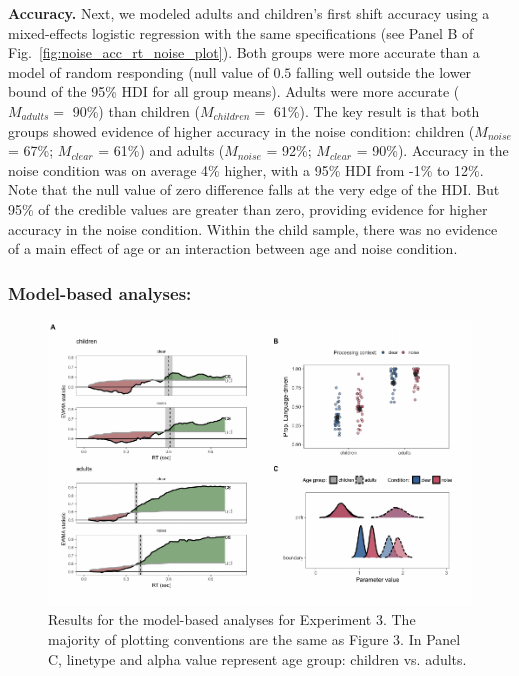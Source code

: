 \documentclass[english,floatsintext,man]{apa6}
\theoremstyle{definition}
\theoremstyle{definition}
\theoremstyle{definition}
\theoremstyle{remark}
\begin{document}
\textbf{Accuracy.} Next, we modeled adults and children's first shift
accuracy using a mixed-effects logistic regression with the same
specifications (see Panel B of Fig.~\ref{fig:noise_acc_rt_noise_plot}).
Both groups were more accurate than a model of random responding (null
value of \(0.5\) falling well outside the lower bound of the 95\% HDI
for all group means). Adults were more accurate (\(M_{adults} =\) 90\%)
than children (\(M_{children} =\) 61\%). The key result is that both
groups showed evidence of higher accuracy in the noise condition:
children (\(M_{noise}\) = 67\%; \(M_{clear}\) = 61\%) and adults
(\(M_{noise}\) = 92\%; \(M_{clear}\) = 90\%). Accuracy in the noise
condition was on average 4\% higher, with a 95\% HDI from -1\% to 12\%.
Note that the null value of zero difference falls at the very edge of
the HDI. But 95\% of the credible values are greater than zero,
providing evidence for higher accuracy in the noise condition. Within
the child sample, there was no evidence of a main effect of age or an
interaction between age and noise condition.

\hypertarget{model-based-analyses-2}{%
\subsubsection{Model-based analyses:}\label{model-based-analyses-2}}

\begin{figure}[tb]

{\centering \includegraphics[width=0.9\linewidth]{figs/noise-model-plots-1} 

}

\caption{Results for the model-based analyses for Experiment 3. The majority of plotting conventions are the same as Figure 3. In Panel C, linetype and alpha value represent age group: children vs. adults.}\label{fig:noise-model-plots}
\end{figure}
\end{document}
